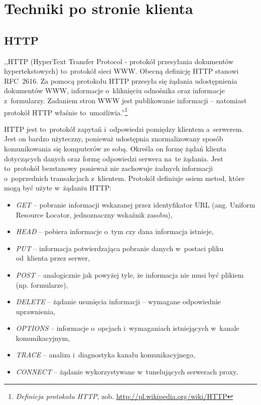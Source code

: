\documentclass[a4paper,12pt,oneside]{report}
\begin{document}
\chapter{Techniki po stronie klienta}
\label{cha:klient}

\section{HTTP}
\label{sec:http}
,,HTTP (HyperText Transfer Protocol - protokół przesyłania dokumentów hypertekstowych) to~protokół sieci WWW. Obecną definicję HTTP stanowi RFC~2616. Za pomocą protokołu HTTP przesyła się żądania udostępnienia dokumentów WWW, informacje o~kliknięciu odnośnika oraz informacje z~formularzy. Zadaniem stron WWW jest publikowanie informacji -- natomiast protokół HTTP właśnie to~umożliwia.''\footnote{\emph{Definicja protokołu HTTP}, zob. \url{http://pl.wikipedia.org/wiki/HTTP}}

HTTP jest to~protokół zapytań i~odpowiedzi pomiędzy klientem a~serwerem. Jest on bardzo użyteczny, ponieważ udostępnia znormalizowany sposób komunikowania się komputerów ze sobą. Określa on formę żądań klienta dotyczących danych oraz formę odpowiedzi serwera na~te żądania. Jest to~protokół bezstanowy ponieważ nie zachowuje żadnych informacji o~poprzednich transakcjach z~klientem. Protokół definiuje osiem metod, które mogą być użyte w~żądaniu HTTP:
\begin{itemize}
  \item \emph{GET} -- pobranie informacji wskazanej przez identyfikator URL (ang. Uniform Resource Locator, jednoznaczny wskaźnik zasobu),
  \item \emph{HEAD} -- pobiera informacje o~tym czy dana informacja istnieje,
  \item \emph{PUT} -- informacja potwierdzająca pobranie danych w~postaci pliku od~klienta przez serwer,
  \item \emph{POST} -- analogicznie jak powyżej tyle, że informacja nie musi być plikiem (np. formularze),
  \item \emph{DELETE} -- żądanie usunięcia informacji -- wymagane odpowiednie uprawnienia,
  \item \emph{OPTIONS} -- informacje o~opcjach i~wymaganiach istniejących w~kanale komunikacyjnym, 
  \item \emph{TRACE} -- analiza i~diagnostyka kanału komunikacyjnego, 
  \item \emph{CONNECT} -- żądanie wykorzystywane w~tunelujących serwerach proxy.
\end{itemize}
\end{document}
